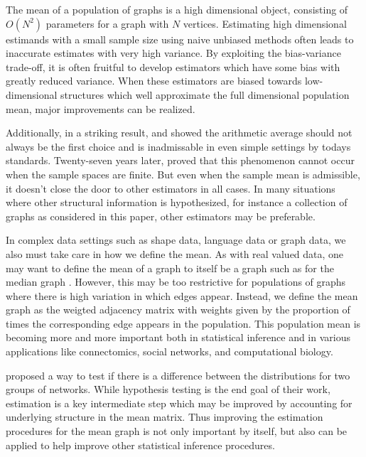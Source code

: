 \documentclass[10pt,letterpaper]{article}
\begin{document}
The mean of a population of graphs is a high dimensional object, consisting of $O(N^2)$ parameters for a graph with $N$ vertices.
Estimating high dimensional estimands with a small sample size using naive unbiased methods often leads to inaccurate estimates with very high variance.
By exploiting the bias-variance trade-off, it is often fruitful to develop estimators which have some bias with greatly reduced variance.
When these estimators are biased towards low-dimensional structures which well approximate the full dimensional population mean, major improvements can be realized.


Additionally, in a striking result, \citet{stein1956inadmissibility} and \citet{james1961estimation} showed the arithmetic average should not always be the first choice and is inadmissable in even simple settings by todays standards. 
Twenty-seven years later, \citet{gutmann1982stein} proved that this phenomenon cannot occur when the sample spaces are finite.
But even when  the sample mean is admissible, it doesn't close the door to other estimators in all cases.
In many situations where other structural information is hypothesized, for instance a collection of graphs as considered in this paper, other estimators may be preferable.

In complex data settings such as shape data, language data or graph data, we also must take care in how we define the mean.
As with real valued data, one may want to define the mean of a graph to itself be a graph such as for the median graph \citep{jiang2001median}.
However, this may be too restrictive for populations of graphs where there is high variation in which edges appear. 
Instead, we define the mean graph as the weigted adjacency matrix with weights given by the proportion of times the corresponding edge appears in the population. 
This population mean is becoming more and more important both in statistical inference and in various applications like connectomics, social networks, and computational biology.

\citet{ginestet2014hypothesis} proposed a way to test if there is a difference between the distributions for two groups of networks.  
While hypothesis testing is the end goal of their work, estimation is a key intermediate step which may be improved by accounting for underlying structure in the mean matrix. 
Thus improving the estimation procedures for the mean graph is not only important by itself, but also can be applied to help improve other statistical inference procedures.
\end{document}
